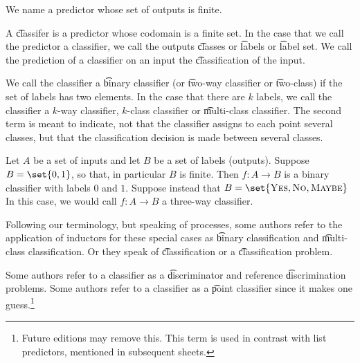 

We name a predictor whose set of outputs is finite.


A \t{classifer} is a predictor whose codomain is a finite set.
In the case that we call the predictor a classifier, we call the outputs \t{classes} or \t{labels} or \t{label set}.
We call the prediction of a classifier on an input the \t{classification} of the input.

We call the classifier a \t{binary classifier} (or \t{two-way classifier} or \t{two-class}) if the set of labels has two elements.
In the case that there are $k$ labels, we call the classifier a \t{$k$-way classifier}, \t{$k$-class classifier} or \t{multi-class classifier}.
The second term is meant to indicate, not that the classifier assigns to each point several classes, but that the classification decision is made between several classes.

Let $A$ be a set of inputs and let $B$ be a set of labels (outputs).
Suppose $B = \set{0, 1}$, so that, in particular $B$ is finite.
Then $f: A \to B$ is a binary classifier with labels $0$ and $1$.
Suppose instead that $B = \set{\text{\textsc{Yes}}, \textsc{No}, \textsc{Maybe}}$
In this case, we would call $f: A \to B$ a three-way classifier.


Following our terminology, but speaking of processes, some authors refer to the application of inductors for these special cases as \t{binary classification} and \t{multi-class classification}.
Or they speak of \t{classification} or a \t{classification problem}.

Some authors refer to a classifier as a \t{discriminator} and reference \t{discrimination problems}.
Some authors refer to a classifier as a \t{point classifier} since it makes one guess.\footnote{Future editions may remove this. This term is used in contrast with list predictors, mentioned in subsequent sheets.}

